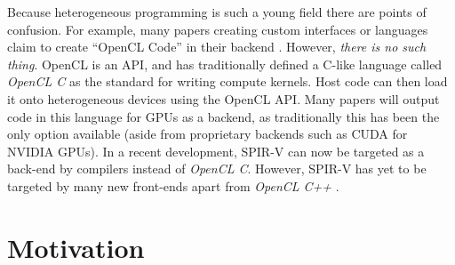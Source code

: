 \documentclass[a4paper,12pt,twoside,openright]{report}
\begin{document}
\begin{itemize}


\end{itemize}


Because heterogeneous programming is such a young field there are points of
confusion. For example, many papers creating custom interfaces or languages
claim to create ``OpenCL Code'' in their backend \cite{JITGPU} \cite{Lime2012}.
However, \textit{there is no such thing}. OpenCL is an API, and has
traditionally defined a C-like language called \textit{OpenCL C} as the
standard for writing compute kernels. Host code can then load it onto
heterogeneous devices using the OpenCL API. Many papers will output code in
this language for GPUs as a backend, as traditionally this has been the only
option available (aside from proprietary backends such as CUDA for NVIDIA
GPUs). In a recent development, SPIR-V can now be targeted as a back-end by
compilers instead of \textit{OpenCL C}. However, SPIR-V has yet to be targeted
by many new front-ends apart from \textit{OpenCL C++}
\cite{OpenCLCPPWhitePaper}.

\section{Motivation}


\end{document}
